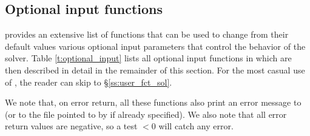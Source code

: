 \subsection{Optional input functions}\label{ss:optional_input}

{\kinsol} provides an extensive list of functions that can be used to change
from their default values various optional input parameters that control the
behavior of the {\kinsol} solver. 
Table \ref{t:optional_input} lists all optional input functions in {\kinsol} which 
are then described in detail in the remainder of this section.
For the most casual use of {\kinsol}, the reader can skip to \S\ref{ss:user_fct_sol}.

We note that, on error return, all these functions also print an error message
to  (or to the file pointed to by  if already specified).
We also note that all error return values are negative, so a test  $<0$
will catch any error.

